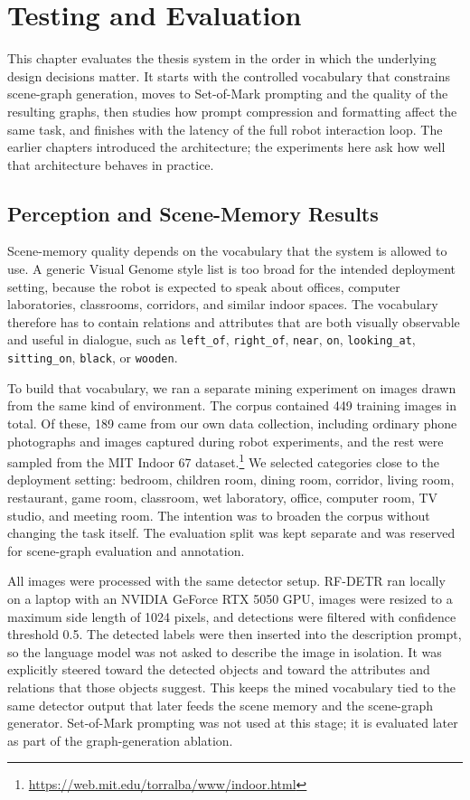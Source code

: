 \chapter{Testing and Evaluation}\label{chap:experiment}

This chapter evaluates the thesis system in the order in which the underlying design decisions matter. It starts with the controlled vocabulary that constrains scene-graph generation, moves to Set-of-Mark prompting and the quality of the resulting graphs, then studies how prompt compression and formatting affect the same task, and finishes with the latency of the full robot interaction loop. The earlier chapters introduced the architecture; the experiments here ask how well that architecture behaves in practice.

\section{Perception and Scene-Memory Results}

Scene-memory quality depends on the vocabulary that the system is allowed to use. A generic Visual Genome style list is too broad for the intended deployment setting, because the robot is expected to speak about offices, computer laboratories, classrooms, corridors, and similar indoor spaces. The vocabulary therefore has to contain relations and attributes that are both visually observable and useful in dialogue, such as \texttt{left\_of}, \texttt{right\_of}, \texttt{near}, \texttt{on}, \texttt{looking\_at}, \texttt{sitting\_on}, \texttt{black}, or \texttt{wooden}.

To build that vocabulary, we ran a separate mining experiment on images drawn from the same kind of environment. The corpus contained 449 training images in total. Of these, 189 came from our own data collection, including ordinary phone photographs and images captured during robot experiments, and the rest were sampled from the MIT Indoor 67 dataset.\footnote{\url{https://web.mit.edu/torralba/www/indoor.html}} We selected categories close to the deployment setting: bedroom, children room, dining room, corridor, living room, restaurant, game room, classroom, wet laboratory, office, computer room, TV studio, and meeting room. The intention was to broaden the corpus without changing the task itself. The evaluation split was kept separate and was reserved for scene-graph evaluation and annotation.

All images were processed with the same detector setup. RF-DETR ran locally on a laptop with an NVIDIA GeForce RTX 5050 GPU, images were resized to a maximum side length of 1024 pixels, and detections were filtered with confidence threshold 0.5. The detected labels were then inserted into the description prompt, so the language model was not asked to describe the image in isolation. It was explicitly steered toward the detected objects and toward the attributes and relations that those objects suggest. This keeps the mined vocabulary tied to the same detector output that later feeds the scene memory and the scene-graph generator. Set-of-Mark prompting was not used at this stage; it is evaluated later as part of the graph-generation ablation.

